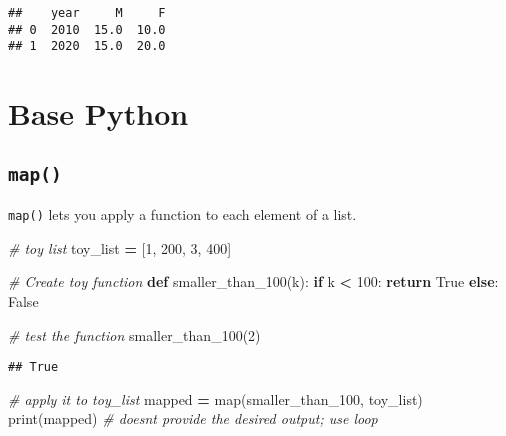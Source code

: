 \documentclass[
]{book}
\newenvironment{Shaded}{\begin{snugshade}}{\end{snugshade}}
\newcommand{\BuiltInTok}[1]{#1}
\newcommand{\CommentTok}[1]{\textcolor[rgb]{0.56,0.35,0.01}{\textit{#1}}}
\newcommand{\ControlFlowTok}[1]{\textcolor[rgb]{0.13,0.29,0.53}{\textbf{#1}}}
\newcommand{\DecValTok}[1]{\textcolor[rgb]{0.00,0.00,0.81}{#1}}
\newcommand{\KeywordTok}[1]{\textcolor[rgb]{0.13,0.29,0.53}{\textbf{#1}}}
\newcommand{\NormalTok}[1]{#1}
\newcommand{\OperatorTok}[1]{\textcolor[rgb]{0.81,0.36,0.00}{\textbf{#1}}}
\newcommand{\VariableTok}[1]{\textcolor[rgb]{0.00,0.00,0.00}{#1}}
\begin{document}
\begin{verbatim}
##    year     M     F
## 0  2010  15.0  10.0
## 1  2020  15.0  20.0
\end{verbatim}

\hypertarget{base-python}{%
\chapter{Base Python}\label{base-python}}

\hypertarget{map}{%
\section{\texorpdfstring{\texttt{map()}}{map()}}\label{map}}

\texttt{map()} lets you apply a function to each element of a list.

\begin{Shaded}
\begin{Highlighting}[]
\CommentTok{\# toy list}
\NormalTok{toy\_list }\OperatorTok{=}\NormalTok{ [}\DecValTok{1}\NormalTok{, }\DecValTok{200}\NormalTok{, }\DecValTok{3}\NormalTok{, }\DecValTok{400}\NormalTok{]}

\CommentTok{\# Create toy function}
\KeywordTok{def}\NormalTok{ smaller\_than\_100(k):}
  \ControlFlowTok{if}\NormalTok{ k }\OperatorTok{\textless{}} \DecValTok{100}\NormalTok{:}
    \ControlFlowTok{return} \VariableTok{True}
  \ControlFlowTok{else}\NormalTok{:}
    \VariableTok{False}
\end{Highlighting}
\end{Shaded}

\begin{Shaded}
\begin{Highlighting}[]
\CommentTok{\# test the function}
\NormalTok{smaller\_than\_100(}\DecValTok{2}\NormalTok{)}
\end{Highlighting}
\end{Shaded}

\begin{verbatim}
## True
\end{verbatim}

\begin{Shaded}
\begin{Highlighting}[]
\CommentTok{\# apply it to toy\_list}
\NormalTok{mapped }\OperatorTok{=} \BuiltInTok{map}\NormalTok{(smaller\_than\_100, toy\_list)}
\BuiltInTok{print}\NormalTok{(mapped) }\CommentTok{\# doesn\textquotesingle{}t provide the desired output; use loop}
\end{Highlighting}
\end{Shaded}
\end{document}
